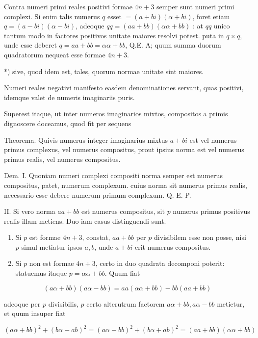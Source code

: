 \documentclass[10pt]{article}
\begin{document}
Contra numeri primi reales positivi formae \(4 n+3\) semper sunt numeri primi complexi. Si enim talis numerus \(q\) esset \(=(a+b i)(\alpha+b i)\), foret etiam \(q=(a-b i)(\alpha-b i)\), adeoque \(q q=(a a+b b)(\alpha \alpha+b b)\) : at \(q q\) unico tantum modo in factores positivos unitate maiores resolvi potest. puta in \(q \times q\), unde esse deberet \(q=a a+b b=\alpha \alpha+b b\), Q.E. A; quum summa duorum quadratorum nequeat esse formae \(4 n+3\).

*) sive, quod idem est, tales, quorum normae unitate sint maiores.

Numeri reales negativi manifesto easdem denominationes servant, quas positivi, idemque valet de numeris imaginariis puris.

Superest itaque, ut inter numeros imaginarios mixtos, compositos a primis dignoscere doceamus, quod fit per sequens

Theorema. Quivis numerus integer imaginarius mixtus \(a+b i\) est vel numerus primus complexus, vel numerus compositus, prout ipsius norma est vel numerus primus realis, vel numerus compositus.

Dem. I. Quoniam numeri complexi compositi norma semper est numerus compositus, patet, numerum complexum. cuius norma sit numerus primus realis, necessario esse debere numerum primum complexum. Q. E. P.

II. Si vero norma \(a a+b b\) est numerus compositus, sit \(p\) numerus primus positivus realis illam metiens. Duo iam casus distinguendi sunt.

\begin{enumerate}
  \item Si \(p\) est formae \(4 n+3\), constat, \(a a+b b\) per \(p\) divisibilem esse non posse, nisi \(p\) simul metiatur ipsos \(a, b\), unde \(a+b i\) erit numerus compositus.

  \item Si \(p\) non est formae \(4 n+3\), certo in duo quadrata decomponi poterit: statuemus itaque \(p=\alpha \alpha+b b\). Quum fiat

\end{enumerate}

\[
(a \alpha+b b)(a \alpha-b b)=a a(\alpha \alpha+b b)-b b(a a+b b)
\]

adeoque per \(p\) divisibilis, \(p\) certo alterutrum factorem \(a \alpha+b b, a \alpha-b b\) metietur, et quum insuper fiat

\[
(a \alpha+b b)^{2}+(b \alpha-a b)^{2}=(a \alpha-b b)^{2}+(b \alpha+a b)^{2}=(a a+b b)(\alpha \alpha+b b)
\]
\end{document}
